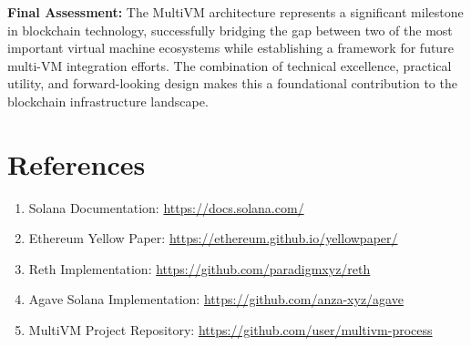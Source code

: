 \documentclass[11pt,a4paper]{article}
\begin{document}
\textbf{Final Assessment:} The MultiVM architecture represents a significant milestone in blockchain technology, successfully bridging the gap between two of the most important virtual machine ecosystems while establishing a framework for future multi-VM integration efforts. The combination of technical excellence, practical utility, and forward-looking design makes this a foundational contribution to the blockchain infrastructure landscape.

\section{References}

\begin{enumerate}
    \item Solana Documentation: \url{https://docs.solana.com/}
    \item Ethereum Yellow Paper: \url{https://ethereum.github.io/yellowpaper/}
    \item Reth Implementation: \url{https://github.com/paradigmxyz/reth}
    \item Agave Solana Implementation: \url{https://github.com/anza-xyz/agave}
    \item MultiVM Project Repository: \url{https://github.com/user/multivm-process}
\end{enumerate}
\end{document}
